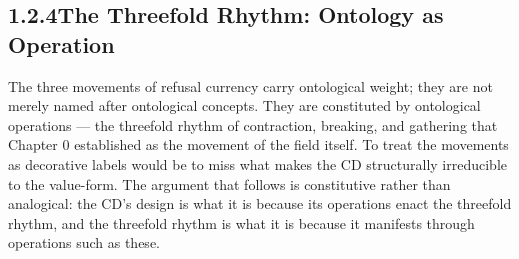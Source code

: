 \subsection{1.2.4\quad The Threefold Rhythm: Ontology as Operation}

The three movements of refusal currency carry ontological weight; they are not merely named after ontological concepts. They are constituted by ontological operations — the threefold rhythm of contraction, breaking, and gathering that Chapter 0 established as the movement of the field itself. To treat the movements as decorative labels would be to miss what makes the CD structurally irreducible to the value-form. The argument that follows is constitutive rather than analogical: the CD’s design is what it is because its operations enact the threefold rhythm, and the threefold rhythm is what it is because it manifests through operations such as these.

